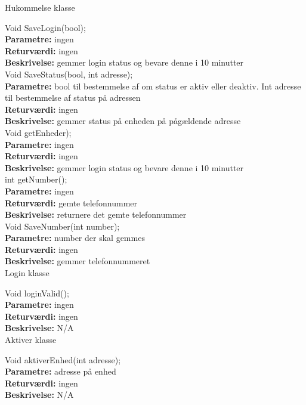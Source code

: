 {\centering Hukommelse klasse}

Void SaveLogin(bool); \\
\textbf{Parametre:} ingen \\
\textbf{Returværdi:} ingen \\
\textbf{Beskrivelse:} gemmer login status og bevare denne i 10 minutter \\

Void SaveStatus(bool, int adresse); \\
\textbf{Parametre:} bool til bestemmelse af om status er aktiv eller deaktiv. Int adresse til bestemmelse af status på adressen \\
\textbf{Returværdi:} ingen \\
\textbf{Beskrivelse:} gemmer status på enheden på pågældende adresse \\

Void getEnheder); \\
\textbf{Parametre:} ingen \\
\textbf{Returværdi:} ingen \\
\textbf{Beskrivelse:} gemmer login status og bevare denne i 10 minutter \\

int getNumber(); \\
\textbf{Parametre:} ingen \\
\textbf{Returværdi:} gemte telefonnummer \\
\textbf{Beskrivelse:} returnere det gemte telefonnummer \\

Void SaveNumber(int number); \\
\textbf{Parametre:} number der skal gemmes \\
\textbf{Returværdi:} ingen \\
\textbf{Beskrivelse:} gemmer telefonnummeret \\

{\centering Login klasse}

Void loginValid(); \\
\textbf{Parametre:} ingen  \\
\textbf{Returværdi:} ingen \\
\textbf{Beskrivelse:} N/A \\

{\centering Aktiver klasse}

Void aktiverEnhed(int adresse); \\
\textbf{Parametre:} adresse på enhed \\
\textbf{Returværdi:} ingen \\
\textbf{Beskrivelse:} N/A \\

